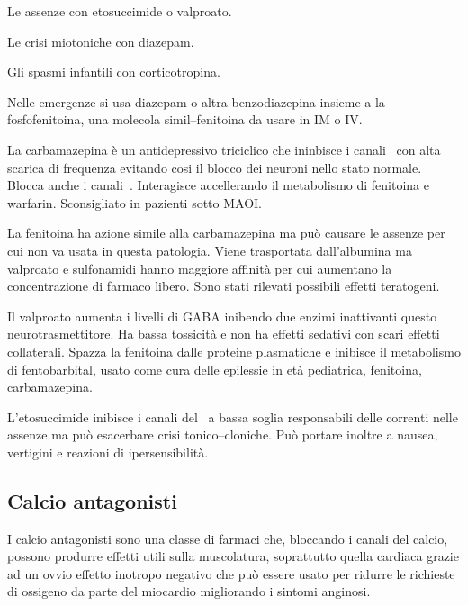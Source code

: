 Le assenze con etosuccimide o valproato.

Le crisi miotoniche con diazepam.

Gli spasmi infantili con corticotropina.

Nelle emergenze si usa diazepam o altra benzodiazepina insieme a la fosfofenitoina, una molecola simil--fenitoina da usare in IM o IV.

La carbamazepina è un antidepressivo triciclico che ininbisce i canali~ con alta scarica di frequenza evitando cosi il blocco dei neuroni nello stato normale. Blocca anche i canali~. Interagisce accellerando il metabolismo di fenitoina e warfarin. Sconsigliato in pazienti sotto MAOI. 

La fenitoina ha azione simile alla carbamazepina ma può causare le assenze per cui non va usata in questa patologia. Viene trasportata dall'albumina ma valproato e sulfonamidi hanno maggiore affinità per cui aumentano la concentrazione di farmaco libero. Sono stati rilevati possibili effetti teratogeni.

Il valproato aumenta i livelli di GABA inibendo due enzimi inattivanti questo neurotrasmettitore. Ha bassa tossicità e non ha effetti sedativi con scari effetti collaterali. Spazza la fenitoina dalle proteine plasmatiche e inibisce il metabolismo di fentobarbital, usato come cura delle epilessie in età pediatrica, fenitoina, carbamazepina.

L'etosuccimide inibisce i canali del~ a bassa soglia responsabili delle correnti nelle assenze ma può esacerbare crisi tonico--cloniche. Può portare inoltre a nausea, vertigini e reazioni di ipersensibilità.

\subsection{Calcio antagonisti}

I calcio antagonisti sono una classe di farmaci che, bloccando i canali del calcio, possono produrre effetti utili sulla muscolatura, soprattutto quella cardiaca grazie ad un ovvio effetto inotropo negativo che può essere usato per ridurre le richieste di ossigeno da parte del miocardio migliorando i sintomi anginosi.

